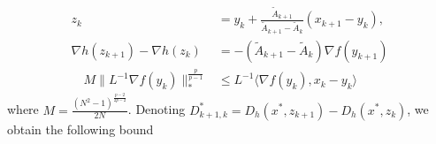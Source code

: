 \documentclass[11pt]{article}
\theoremstyle{plain}
\begin{document}
\begin{subequations}
\begin{align}
z_{k} &= y_k + \frac{\tilde A_{k+1}}{\tilde A_{k+1} -\tilde A_{k}} (x_{k+1} - y_k),\label{Eq:ZSeqAcc}\\
\nabla h(z_{k+1}) - \nabla h(z_{k}) &= -(\tilde A_{k+1} -  \tilde A_{k})  \nabla f(y_{k+1})\label{Eq:XSeqAcc}\\
\quad M \|L^{-1}\nabla f(y_{k})\|_\ast^{\frac{p}{p-1}} &\leq L^{-1}\langle\nabla f(y_{k}), x_{k} - y_{k}\rangle \label{Eq:YSeqAcc}
\end{align}
\end{subequations}
where $M = \frac{(N^2 - 1)^{\frac{p-2}{2p-2}}}{2N}$. Denoting $D^\ast_{k+1, k} = D_h(x^\ast,z_{k+1})- D_h(x^\ast,z_{k})$, we obtain the following bound 
\end{document}
